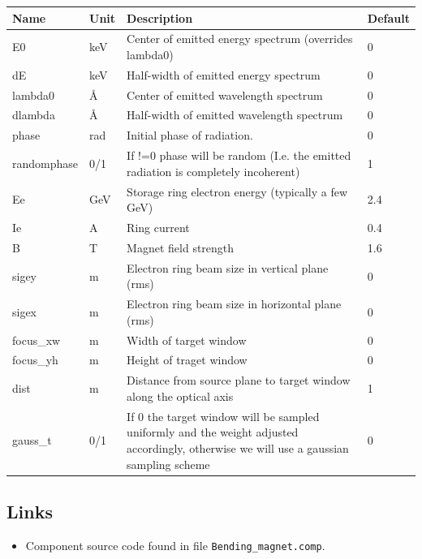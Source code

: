 \begin{longtable}{p{}p{}p{}p{}}
\toprule
\textbf{Name} & \textbf{Unit} & \textbf{Description} & \textbf{Default} \\
\midrule
\endhead
E0 & keV & Center of emitted energy spectrum (overrides lambda0) & 0 \\
dE & keV & Half-width of emitted energy spectrum & 0 \\
lambda0 & \AA{} & Center of emitted wavelength spectrum & 0 \\
dlambda & \AA{} & Half-width of emitted wavelength spectrum & 0 \\
phase & rad & Initial phase of radiation. & 0 \\
randomphase & 0/1 & If !=0 phase will be random (I.e. the emitted radiation is completely incoherent) & 1 \\
Ee & GeV & Storage ring electron energy (typically a few GeV) & 2.4 \\
Ie & A & Ring current & 0.4 \\
B & T & Magnet field strength & 1.6 \\
sigey & m & Electron ring beam size in vertical plane (rms) & 0 \\
sigex & m & Electron ring beam size in horizontal plane (rms) & 0 \\
focus\_xw & m & Width of target window & 0 \\
focus\_yh & m & Height of traget window & 0 \\
dist & m & Distance from source plane to target window along the optical axis & 1 \\
gauss\_t & 0/1 & If 0 the target window will be sampled uniformly and the weight adjusted accordingly, otherwise we will use a gaussian sampling scheme & 0 \\
\bottomrule
\end{longtable}

\subsection*{Links}
\begin{itemize}
  \item Component source code found in file \texttt{Bending\_magnet.comp}.
\end{itemize}

